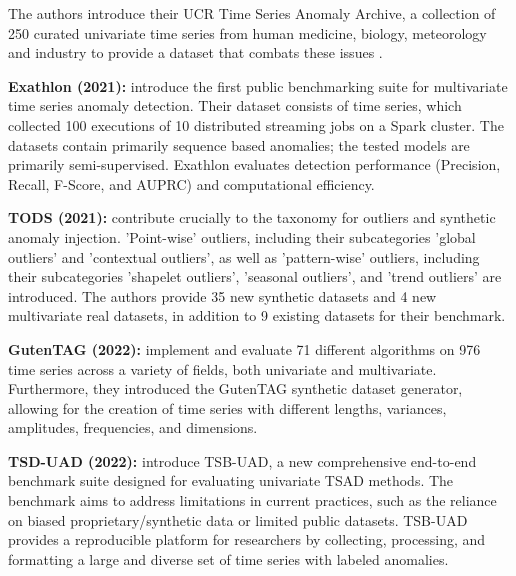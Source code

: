\documentclass[12pt,oneside]{article}
\begin{document}
The authors introduce their UCR Time Series Anomaly Archive, a collection of 250 curated univariate time series from human medicine, biology, meteorology and industry to provide a dataset that combats these issues \parencite{wu2021current}. \par
\textbf{Exathlon (2021):} \cite{jacob2021exathlonbenchmarkexplainableanomaly} introduce the first public benchmarking suite for multivariate time series anomaly detection. Their dataset consists of time series, which collected 100 executions of 10 distributed streaming jobs on a Spark cluster. The datasets contain primarily sequence based anomalies; the tested models are primarily semi-supervised. Exathlon evaluates detection performance (Precision, Recall, F-Score, and AUPRC) and computational efficiency. \par
\textbf{TODS (2021):} \cite{NEURIPS} contribute crucially to the taxonomy for outliers and synthetic anomaly injection. 'Point-wise' outliers, including their subcategories 'global outliers' and 'contextual outliers', as well as 'pattern-wise' outliers, including their subcategories 'shapelet outliers', 'seasonal outliers', and 'trend outliers' are introduced. The authors provide 35 new synthetic datasets and 4 new multivariate real datasets, in addition to 9 existing datasets for their benchmark. \par
\textbf{GutenTAG (2022):} \cite{SchmidlEtAl2022Anomaly} implement and evaluate 71 different algorithms on 976 time series across a variety of fields, both univariate and multivariate. Furthermore, they introduced the GutenTAG synthetic dataset generator, allowing for the creation of time series with different lengths, variances, amplitudes, frequencies, and dimensions. \par
\textbf{TSD-UAD (2022):} \cite{paparrizos2022tsb} introduce TSB-UAD, a new comprehensive end-to-end benchmark suite designed for evaluating univariate TSAD methods. The benchmark aims to address limitations in current practices, such as the reliance on biased proprietary/synthetic data or limited public datasets. TSB-UAD provides a reproducible platform for researchers by collecting, processing, and formatting a large and diverse set of time series with labeled anomalies.
\end{document}
